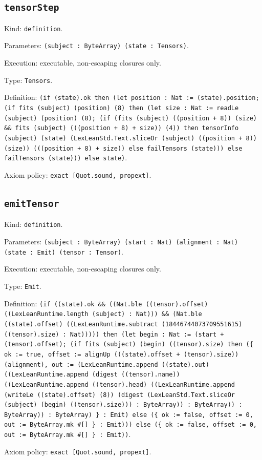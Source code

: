 \documentclass[11pt]{article}
\begin{document}
\subsection*{\texttt{tensorStep}}
\noindent Kind: \texttt{definition}.\par
\noindent Parameters: \texttt{(subject : ByteArray) (state : Tensors)}.\par
\noindent Execution: executable, non-escaping closures only.\par
\noindent Type: \texttt{Tensors}.\par
\noindent Definition: \texttt{(if (state).ok then (let position : Nat := (state).position; (if fits (subject) (position) (8) then (let size : Nat := readLe (subject) (position) (8); (if (fits (subject) ((position + 8)) (size) \&\& fits (subject) (((position + 8) + size)) (4)) then tensorInfo (subject) (state) (LexLeanStd.Text.sliceOr (subject) ((position + 8)) (size)) (((position + 8) + size)) else failTensors (state))) else failTensors (state))) else state)}.\par
\noindent Axiom policy: \texttt{exact [Quot.sound, propext]}.\par
\subsection*{\texttt{emitTensor}}
\noindent Kind: \texttt{definition}.\par
\noindent Parameters: \texttt{(subject : ByteArray) (start : Nat) (alignment : Nat) (state : Emit) (tensor : Tensor)}.\par
\noindent Execution: executable, non-escaping closures only.\par
\noindent Type: \texttt{Emit}.\par
\noindent Definition: \texttt{(if ((state).ok \&\& ((Nat.ble ((tensor).offset) ((LexLeanRuntime.length (subject) : Nat))) \&\& (Nat.ble ((state).offset) ((LexLeanRuntime.subtract (18446744073709551615) ((tensor).size) : Nat))))) then (let begin : Nat := (start + (tensor).offset); (if fits (subject) (begin) ((tensor).size) then (\{ ok := true, offset := alignUp (((state).offset + (tensor).size)) (alignment), out := (LexLeanRuntime.append ((state).out) ((LexLeanRuntime.append (digest ((tensor).name)) ((LexLeanRuntime.append ((tensor).head) ((LexLeanRuntime.append (writeLe ((state).offset) (8)) (digest (LexLeanStd.Text.sliceOr (subject) (begin) ((tensor).size))) : ByteArray)) : ByteArray)) : ByteArray)) : ByteArray) \} : Emit) else (\{ ok := false, offset := 0, out := ByteArray.mk \#[] \} : Emit))) else (\{ ok := false, offset := 0, out := ByteArray.mk \#[] \} : Emit))}.\par
\noindent Axiom policy: \texttt{exact [Quot.sound, propext]}.\par
\end{document}
